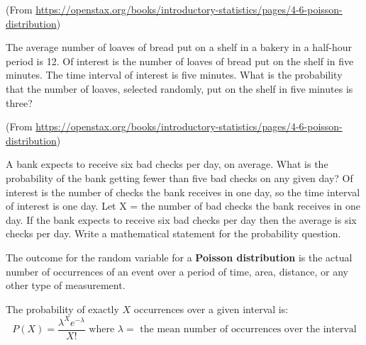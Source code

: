 \documentclass[12pt, letterpaper]{article}
\newcounter{exercise}
\theoremstyle{definition}
\begin{document}
\begin{exercise}
(From \href{https://openstax.org/books/introductory-statistics/pages/4-6-poisson-distribution}{https://openstax.org/books/introductory-statistics/pages/4-6-poisson-distribution})

The average number of loaves of bread put on a shelf in a bakery in a half-hour period is 12. Of interest is the number of loaves of bread put on the shelf in five minutes. The time interval of interest is five minutes. What is the probability that the number of loaves, selected randomly, put on the shelf in five minutes is three?
\end{exercise}

\vfill

\begin{exercise}
(From \href{https://openstax.org/books/introductory-statistics/pages/4-6-poisson-distribution}{https://openstax.org/books/introductory-statistics/pages/4-6-poisson-distribution})

A bank expects to receive six bad checks per day, on average. What is the probability of the bank getting fewer than five bad checks on any given day? Of interest is the number of checks the bank receives in one day, so the time interval of interest is one day. Let X = the number of bad checks the bank receives in one day. If the bank expects to receive six bad checks per day then the average is six checks per day. Write a mathematical statement for the probability question.
\end{exercise}

\vfill

\newpage

\begin{statement}
The outcome for the random variable for a \textbf{Poisson distribution} is the actual number of occurrences of an event over a period of time, area, distance, or any other type of measurement.

\vspace*{.1in}

The probability of exactly $X$ occurrences over a given interval is:
$$ P(X) = \frac{\lambda^Xe^{-\lambda}}{X!} \text{ where $\lambda=$ the mean number of occurrences over the interval} $$

\end{statement}


\vfill
\end{document}
